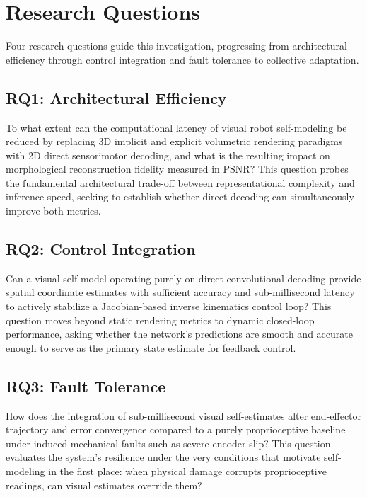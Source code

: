 \documentclass[12pt,a4paper,oneside]{report}
\begin{document}
\section{Research Questions}

Four research questions guide this investigation, progressing from architectural efficiency through control integration and fault tolerance to collective adaptation.

\subsection{RQ1: Architectural Efficiency}

To what extent can the computational latency of visual robot self-modeling be reduced by replacing 3D implicit and explicit volumetric rendering paradigms with 2D direct sensorimotor decoding, and what is the resulting impact on morphological reconstruction fidelity measured in PSNR? This question probes the fundamental architectural trade-off between representational complexity and inference speed, seeking to establish whether direct decoding can simultaneously improve both metrics.

\subsection{RQ2: Control Integration}

Can a visual self-model operating purely on direct convolutional decoding provide spatial coordinate estimates with sufficient accuracy and sub-millisecond latency to actively stabilize a Jacobian-based inverse kinematics control loop? This question moves beyond static rendering metrics to dynamic closed-loop performance, asking whether the network's predictions are smooth and accurate enough to serve as the primary state estimate for feedback control.

\subsection{RQ3: Fault Tolerance}

How does the integration of sub-millisecond visual self-estimates alter end-effector trajectory and error convergence compared to a purely proprioceptive baseline under induced mechanical faults such as severe encoder slip? This question evaluates the system's resilience under the very conditions that motivate self-modeling in the first place: when physical damage corrupts proprioceptive readings, can visual estimates override them?
\end{document}
